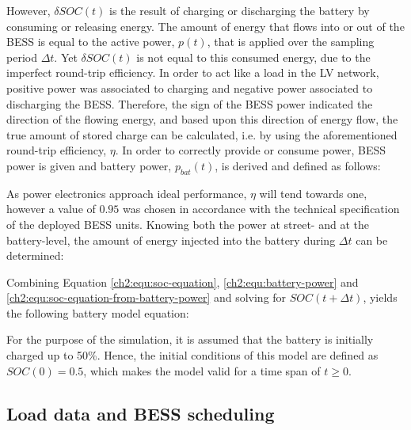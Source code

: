 

However, $\delta SOC(t)$ is the result of charging or discharging the battery by consuming or releasing energy.
The amount of energy that flows into or out of the BESS is equal to the active power, $p(t)$, that is applied over the sampling period $\Delta t$.
Yet $\delta SOC(t)$ is not equal to this consumed energy, due to the imperfect round-trip efficiency.
In order to act like a load in the LV network, positive power was associated to charging and negative power associated to discharging the BESS.
Therefore, the sign of the BESS power indicated the direction of the flowing energy, and based upon this direction of energy flow, the true amount of stored charge can be calculated, i.e. by using the aforementioned round-trip efficiency, $\eta$.
In order to correctly provide or consume power, BESS power is given and battery power, $p_{bat}(t)$, is derived and defined as follows:



As power electronics approach ideal performance, $\eta$ will tend towards one, however a value of $0.95$ was chosen in accordance with the technical specification of the deployed BESS units.
Knowing both the power at street- and at the battery-level, the amount of energy injected into the battery during $\Delta t$ can be determined:



Combining Equation \ref{ch2:equ:soc-equation}, \ref{ch2:equ:battery-power} and \ref{ch2:equ:soc-equation-from-battery-power} and solving for $SOC(t+\Delta t)$, yields the following battery model equation:



For the purpose of the simulation, it is assumed that the battery is initially charged up to 50\%.
Hence, the initial conditions of this model are defined as $SOC(0) = 0.5$, which makes the model valid for a time span of $t \geq 0$.

\subsection{Load data and BESS scheduling}


